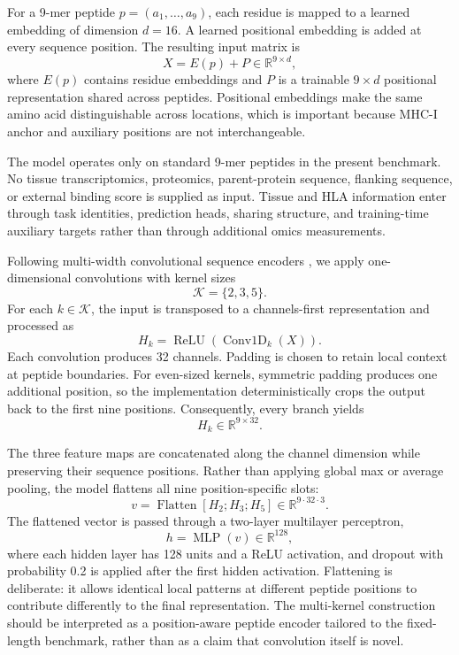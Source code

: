 For a 9-mer peptide \(p=(a_1,\ldots,a_9)\), each residue is mapped to a learned embedding of dimension \(d=16\). A learned positional embedding is added at every sequence position. The resulting input matrix is
\[
X=E(p)+P \in \mathbb{R}^{9\times d},
\]
where \(E(p)\) contains residue embeddings and \(P\) is a trainable \(9\times d\) positional representation shared across peptides. Positional embeddings make the same amino acid distinguishable across locations, which is important because MHC-I anchor and auxiliary positions are not interchangeable.

The model operates only on standard 9-mer peptides in the present benchmark. No tissue transcriptomics, proteomics, parent-protein sequence, flanking sequence, or external binding score is supplied as input. Tissue and HLA information enter through task identities, prediction heads, sharing structure, and training-time auxiliary targets rather than through additional omics measurements.

Following multi-width convolutional sequence encoders \cite{kim2014cnn}, we apply one-dimensional convolutions with kernel sizes
\[
\mathcal{K}=\{2,3,5\}.
\]
For each \(k\in\mathcal{K}\), the input is transposed to a channels-first representation and processed as
\[
H_k
=
\operatorname{ReLU}
\left(
\operatorname{Conv1D}_{k}(X)
\right).
\]
Each convolution produces 32 channels. Padding is chosen to retain local context at peptide boundaries. For even-sized kernels, symmetric padding produces one additional position, so the implementation deterministically crops the output back to the first nine positions. Consequently, every branch yields
\[
H_k\in\mathbb{R}^{9\times 32}.
\]

The three feature maps are concatenated along the channel dimension while preserving their sequence positions. Rather than applying global max or average pooling, the model flattens all nine position-specific slots:
\[
v
=
\operatorname{Flatten}
\left[
H_2;H_3;H_5
\right]
\in\mathbb{R}^{9\cdot32\cdot3}.
\]
The flattened vector is passed through a two-layer multilayer perceptron,
\[
h
=
\operatorname{MLP}(v)
\in\mathbb{R}^{128},
\]
where each hidden layer has 128 units and a ReLU activation, and dropout with probability 0.2 is applied after the first hidden activation. Flattening is deliberate: it allows identical local patterns at different peptide positions to contribute differently to the final representation. The multi-kernel construction should be interpreted as a position-aware peptide encoder tailored to the fixed-length benchmark, rather than as a claim that convolution itself is novel.


